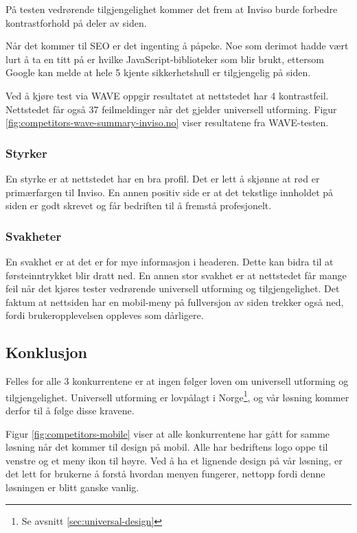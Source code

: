 På testen vedrørende tilgjengelighet kommer det frem at Inviso burde forbedre kontrastforhold på deler av siden.

Når det kommer til SEO er det ingenting å påpeke. Noe som derimot hadde vært lurt å ta en titt på er hvilke JavaScript-biblioteker som blir brukt, ettersom Google kan melde at hele 5 kjente sikkerhetshull er tilgjengelig på siden. 

Ved å kjøre test via WAVE oppgir resultatet at nettstedet har 4 kontrastfeil. Nettstedet får også 37 feilmeldinger når det gjelder universell utforming. Figur \ref{fig:competitors-wave-summary-inviso.no} viser resultatene fra WAVE-testen.

\subsubsection{Styrker} 
En styrke er at nettstedet har en bra profil. Det er lett å skjønne at rød er primærfargen til Inviso. En annen positiv side er at det tekstlige innholdet på siden er godt skrevet og får bedriften til å fremstå profesjonelt.

\subsubsection{Svakheter}
En svakhet er at det er for mye informasjon i headeren. Dette kan bidra til at førsteinntrykket blir dratt ned. En annen stor svakhet er at nettstedet får mange feil når det kjøres tester vedrørende universell utforming og tilgjengelighet. Det faktum at nettsiden har en mobil-meny på fullversjon av siden trekker også ned, fordi brukeropplevelsen oppleves som dårligere.

\subsection{Konklusjon}
\label{sec:analysis-competitors-conclusion}
Felles for alle 3 konkurrentene er at ingen følger loven om universell utforming og tilgjengelighet. Universell utforming er lovpålagt i Norge\footnote{Se avsnitt \ref{sec:universal-design}}, og vår løsning kommer derfor til å følge disse kravene. 


Figur \ref{fig:competitors-mobile} viser at alle konkurrentene har gått for samme løsning når det kommer til design på mobil. Alle har bedriftens logo oppe til venstre og et meny ikon til høyre. Ved å ha et lignende design på vår løsning, er det lett for brukerne å forstå hvordan menyen fungerer, nettopp fordi denne løsningen er blitt ganske vanlig.

